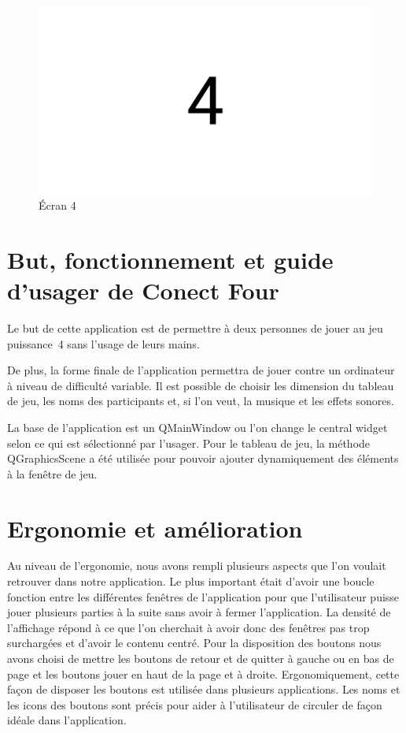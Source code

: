 \begin{figure}[H]
    \centering
    \includegraphics[width=6in]{img/4}
    \caption{Écran 4}
\end{figure}

\section{But, fonctionnement et guide d'usager de Conect Four}

Le but de cette application est de permettre à deux personnes de jouer au jeu puissance~4 sans l’usage de leurs mains.

De plus, la forme finale de l’application permettra de jouer contre un ordinateur à niveau de difficulté variable.
Il est possible de choisir les dimension du tableau de jeu, les noms des participants et, si l’on veut, la musique et les effets sonores.

La base de l’application est un QMainWindow ou l’on change le central widget selon ce qui est sélectionné par l’usager.
Pour le tableau de jeu, la méthode QGraphicsScene a été utilisée pour pouvoir ajouter dynamiquement des éléments à la fenêtre de jeu.

\section{Ergonomie et amélioration}

Au niveau de l'ergonomie, nous avons rempli plusieurs aspects que l'on voulait retrouver dans notre application.
Le plus important était d'avoir une boucle fonction entre les différentes fenêtres de l'application pour que l'utilisateur puisse jouer plusieurs parties à la suite sans avoir à fermer l'application.
La densité de l'affichage répond à ce que l'on cherchait à avoir donc des fenêtres pas trop surchargées et d'avoir le contenu centré.
Pour la disposition des boutons nous avons choisi de mettre les boutons de retour et de quitter à gauche ou en bas de page et les boutons jouer en haut de la page et à droite.
Ergonomiquement, cette façon de disposer les boutons est utilisée dans plusieurs applications.
Les noms et les icons des boutons sont précis pour aider à l'utilisateur de circuler de façon idéale dans l'application.

